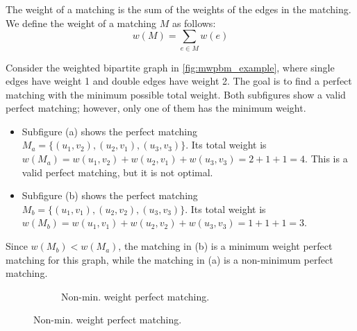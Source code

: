 The weight of a matching is the sum of the weights of the edges in the matching. We define the weight of a matching $M$ as follows:
\begin{equation}
    w(M) = \sum_{e \in M} w(e)
\end{equation}

\begin{example}
    Consider the weighted bipartite graph in \cref{fig:mwpbm_example}, where single edges have weight 1 and double edges have weight 2. The goal is to find a perfect matching with the minimum possible total weight. Both subfigures show a valid perfect matching; however, only one of them has the minimum weight.
    \begin{itemize}
        \item Subfigure (a) shows the perfect matching $M_a = \{(u_1, v_2), (u_2, v_1), (u_3, v_3)\}$. Its total weight is $w(M_a) = w(u_1, v_2) + w(u_2, v_1) + w(u_3, v_3) = 2 + 1 + 1 = 4$. This is a valid perfect matching, but it is not optimal.
        \item Subfigure (b) shows the perfect matching $M_b = \{(u_1, v_1), (u_2, v_2), (u_3, v_3)\}$. Its total weight is $w(M_b) = w(u_1, v_1) + w(u_2, v_2) + w(u_3, v_3) = 1 + 1 + 1 = 3$.
    \end{itemize}
    Since $w(M_b) < w(M_a)$, the matching in (b) is a minimum weight perfect matching for this graph, while the matching in (a) is a non-minimum perfect matching.
    \begin{figure}[H]
        \centering
        \begin{subfigure}[b]{0.45\textwidth}
            \centering
            \caption{Non-min. weight perfect matching.}

\end{subfigure}
\end{figure}
\end{example}
